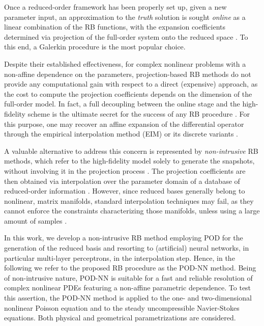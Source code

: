 \documentclass{elsarticle}
\numberwithin{equation}{section}
\theoremstyle{theorem}
\theoremstyle{definition}
\theoremstyle{remark}
\theoremstyle{proposition}
\numberwithin{figure}{section}
\begin{document}
		Once a reduced-order framework has been properly set up, given a new parameter input, an approximation to the \emph{truth} solution is sought \emph{online} as a linear combination of the RB functions, with the expansion coefficients determined via projection of the full-order system onto the reduced space \cite{Buf12}. To this end, a Galerkin procedure is the most popular choice. 
		
		Despite their established effectiveness, for complex nonlinear problems with a non-affine dependence on the parameters, projection-based RB methods do not provide any computational gain with respect to a direct (expensive) approach, as the cost to compute the projection coefficients depends on the dimension of the full-order model. In fact, a full decoupling between the online stage and the high-fidelity scheme is the ultimate secret for the success of any RB procedure \cite{QMN15}. For this purpose, one may recover an affine expansion of the differential operator through the empirical interpolation method (EIM) \cite{Bar04} or its discrete variants \cite{Cha10, NMA15}. 
		
		A valuable alternative to address this concern is represented by \emph{non-intrusive} RB methods, which refer to the high-fidelity model solely to generate the snapshots, without involving it in the projection process \cite{Chen17}. The projection coefficients are then obtained via interpolation over the parameter domain of a database of reduced-order information \cite{Cas15}. However, since reduced bases generally belong to nonlinear, matrix manifolds, standard interpolation techniques may fail, as they cannot enforce the constraints characterizing those manifolds, unless using a large amount of samples \cite{Ams10, BNR00}. 
		
		In this work, we develop a non-intrusive RB method employing POD for the generation of the reduced basis and resorting to (artificial) neural networks, in particular multi-layer perceptrons, in the interpolation step. Hence, in the following we refer to the proposed RB procedure as the POD-NN method. Being of non-intrusive nature, POD-NN is suitable for a fast and reliable resolution of complex nonlinear PDEs featuring a non-affine parametric dependence. To test this assertion, the POD-NN method is applied to the one- and two-dimensional nonlinear Poisson equation and to the steady uncompressible Navier-Stokes equations. Both physical and geometrical parametrizations are considered.
		
\end{document}
